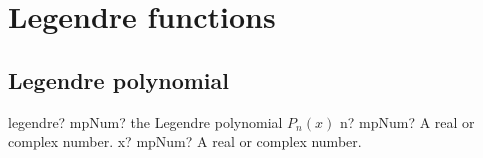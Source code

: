 %
%
%
%
%
%
%
%
%
%



\section{Legendre functions}


\subsection{Legendre polynomial}

\begin{mpFunctionsExtract}
	\mpFunctionTwo
	{legendre? mpNum? the Legendre polynomial $P_n(x)$}
	{n? mpNum? A real or complex number.}
	{x? mpNum? A real or complex number.}	
\end{mpFunctionsExtract}

